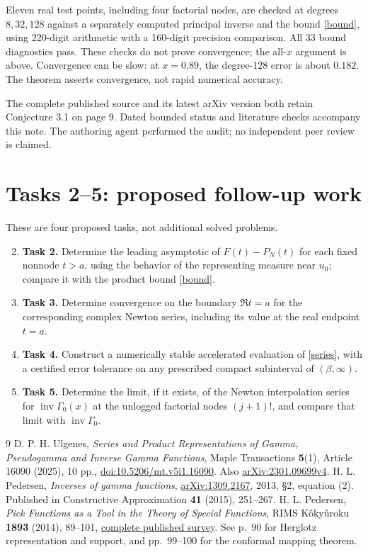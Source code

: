 \documentclass[11pt]{article}
\newcommand{\invGamma}{\operatorname{inv}\Gamma_0}
\begin{document}
Eleven real test points, including four factorial nodes, are checked
at degrees $8,32,128$ against a separately computed principal
inverse and the bound \eqref{bound}, using 220-digit arithmetic
with a 160-digit precision comparison. All 33 bound diagnostics pass.
These checks do not prove convergence; the all-$x$ argument is above.
Convergence can be slow: at $x=0.89$, the degree-128 error is about
$0.182$. The theorem asserts convergence, not rapid numerical accuracy.

The complete published source and its latest arXiv version both
retain Conjecture 3.1 on page 9. Dated bounded status and literature
checks accompany this note. The authoring agent performed the audit;
no independent peer review is claimed.

\newpage
\section*{Tasks 2--5: proposed follow-up work}
These are four proposed tasks, not additional solved problems.
\begin{enumerate}
 \setcounter{enumi}{1}
 \item \textbf{Task 2.} Determine the leading asymptotic of
 $F(t)-P_N(t)$ for each fixed nonnode $t>a$, using the behavior
 of the representing measure near $u_0$; compare it with
 the product bound \eqref{bound}.
 \item \textbf{Task 3.} Determine convergence on the boundary
 $\Re t=a$ for the corresponding complex Newton series, including
 its value at the real endpoint $t=a$.
 \item \textbf{Task 4.} Construct a numerically stable accelerated
 evaluation of \eqref{series}, with a certified error tolerance
 on any prescribed compact subinterval of $(\beta,\infty)$.
 \item \textbf{Task 5.} Determine the limit, if it exists, of the
 Newton interpolation series for $\invGamma(x)$ at the unlogged
 factorial nodes $(j+1)!$, and compare that limit with $\invGamma$.
\end{enumerate}

\begin{thebibliography}{9}
 D. P. H. Ulgenes,
\emph{Series and Product Representations of Gamma, Pseudogamma and
Inverse Gamma Functions}, Maple Transactions \textbf{5}(1),
Article 16090 (2025), 10 pp.,
\href{https://doi.org/10.5206/mt.v5i1.16090}{doi:10.5206/mt.v5i1.16090}.
Also \href{https://arxiv.org/abs/2301.09699v4}{arXiv:2301.09699v4}.
 H. L. Pedersen,
\emph{Inverses of gamma functions},
\href{https://arxiv.org/abs/1309.2167}{arXiv:1309.2167}, 2013,
\S2, equation (2).
Published in Constructive Approximation \textbf{41} (2015), 251--267.
 H. L. Pedersen,
\emph{Pick Functions as a Tool in the Theory of Special Functions},
RIMS K\^oky\^uroku \textbf{1893} (2014), 89--101,
\href{https://www.kurims.kyoto-u.ac.jp/~kyodo/kokyuroku/contents/pdf/1893-12.pdf}{complete published survey}.
See p.~90 for Herglotz representation and support, and
pp.~99--100 for the conformal mapping theorem.
\end{thebibliography}
\end{document}

